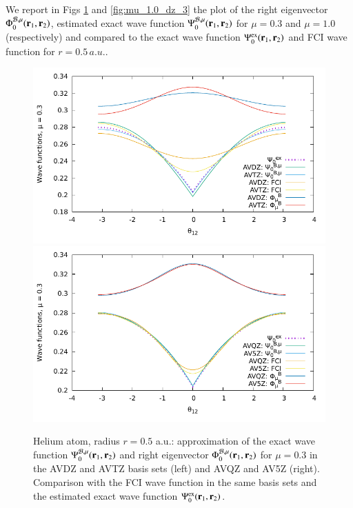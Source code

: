 \documentclass[aip,jcp,reprint,noshowkeys,superscriptaddress]{revtex4-1}
\newcommand{\br}[0]{{\bf {r}}}
\newcommand{\psiex}[0]{\Psi^{\text{ex}}_0}
\newcommand{\phimub}[0]{\Phi^{\mathcal{B},\mu}_0}
\newcommand{\psimub}[0]{\Psi^{\mathcal{B},\mu}_0}
\begin{document}
We report in Figs \ref{fig:mu_0.3_dz_3} and \ref{fig:mu_1.0_dz_3} the plot of the right eigenvector $\phimub(\br{}_1,\br{}_2)$, estimated exact wave function $\psimub(\br{}_1,\br{}_2)$ for $\mu=0.3$ and $\mu=1.0$ (respectively) and compared to the exact wave function $\psiex(\br{}_1,\br{}_2)$ and FCI wave function for $r=0.5\,a.u.$. 
\begin{figure}
 \label{fig:mu_0.3_dz_3}
        \includegraphics[width=0.45\linewidth]{plots/He//He_mu_0_3_cusp_avdz_avtz_3.pdf}
        \includegraphics[width=0.45\linewidth]{plots/He/He_mu_0_3_cusp_avqz_av5z_3.pdf}\\
        \caption{
        Helium atom, radius $r=0.5$ a.u.: approximation of the exact wave function $\psimub(\br{}_1,\br{}_2)$ and right eigenvector $\phimub(\br{}_1,\br{}_2)$ for $\mu=0.3$ in the AVDZ and AVTZ basis sets (left) and AVQZ and AV5Z (right). Comparison with the FCI wave function in the same basis sets and the estimated exact wave function $\psiex(\br{}_1,\br{}_2)$.  }
\end{figure}
\end{document}
